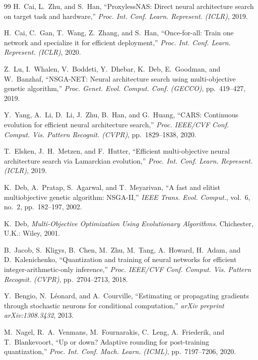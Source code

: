 \documentclass[journal]{IEEEtran}
\begin{document}
\begin{thebibliography}{99}
H.~Cai, L.~Zhu, and S.~Han,
``ProxylessNAS: Direct neural architecture search on target task and hardware,''
\textit{Proc. Int. Conf. Learn. Represent. (ICLR)}, 2019.

H.~Cai, C.~Gan, T.~Wang, Z.~Zhang, and S.~Han,
``Once-for-all: Train one network and specialize it for efficient deployment,''
\textit{Proc. Int. Conf. Learn. Represent. (ICLR)}, 2020.

Z.~Lu, I.~Whalen, V.~Boddeti, Y.~Dhebar, K.~Deb, E.~Goodman, and W.~Banzhaf,
``NSGA-NET: Neural architecture search using multi-objective genetic algorithm,''
\textit{Proc. Genet. Evol. Comput. Conf. (GECCO)}, pp.~419--427, 2019.

Y.~Yang, A.~Li, D.~Li, J.~Zhu, B.~Han, and G.~Huang,
``CARS: Continuous evolution for efficient neural architecture search,''
\textit{Proc. IEEE/CVF Conf. Comput. Vis. Pattern Recognit. (CVPR)}, pp.~1829--1838, 2020.

T.~Elsken, J.~H.~Metzen, and F.~Hutter,
``Efficient multi-objective neural architecture search via Lamarckian evolution,''
\textit{Proc. Int. Conf. Learn. Represent. (ICLR)}, 2019.

K.~Deb, A.~Pratap, S.~Agarwal, and T.~Meyarivan,
``A fast and elitist multiobjective genetic algorithm: NSGA-II,''
\textit{IEEE Trans. Evol. Comput.}, vol.~6, no.~2, pp.~182--197, 2002.

K.~Deb,
\textit{Multi-Objective Optimization Using Evolutionary Algorithms}.
Chichester, U.K.: Wiley, 2001.

B.~Jacob, S.~Kligys, B.~Chen, M.~Zhu, M.~Tang, A.~Howard, H.~Adam, and
D.~Kalenichenko,
``Quantization and training of neural networks for efficient integer-arithmetic-only inference,''
\textit{Proc. IEEE/CVF Conf. Comput. Vis. Pattern Recognit. (CVPR)}, pp.~2704--2713, 2018.

Y.~Bengio, N.~L\'{e}onard, and A.~Courville,
``Estimating or propagating gradients through stochastic neurons for conditional computation,''
\textit{arXiv preprint arXiv:1308.3432}, 2013.

M.~Nagel, R.~A.~Venmans, M.~Fournarakis, C.~Leng, A.~Friederik, and
T.~Blankevoort,
``Up or down? Adaptive rounding for post-training quantization,''
\textit{Proc. Int. Conf. Mach. Learn. (ICML)}, pp.~7197--7206, 2020.


\end{thebibliography}
\end{document}
